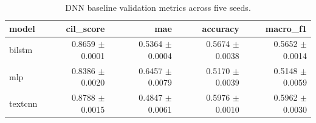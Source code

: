 \begin{table}[htbp]
\centering
\caption{DNN baseline validation metrics across five seeds.}
\label{tab:dnn-seed-summary}
\begin{tabular}{lrrrr}
\toprule
model & cil\_score & mae & accuracy & macro\_f1 \\
\midrule
bilstm & 0.8659 $\pm$ 0.0001 & 0.5364 $\pm$ 0.0004 & 0.5674 $\pm$ 0.0038 & 0.5652 $\pm$ 0.0014 \\
mlp & 0.8386 $\pm$ 0.0020 & 0.6457 $\pm$ 0.0079 & 0.5170 $\pm$ 0.0039 & 0.5148 $\pm$ 0.0059 \\
textcnn & 0.8788 $\pm$ 0.0015 & 0.4847 $\pm$ 0.0061 & 0.5976 $\pm$ 0.0010 & 0.5962 $\pm$ 0.0030 \\
\bottomrule
\end{tabular}
\end{table}
